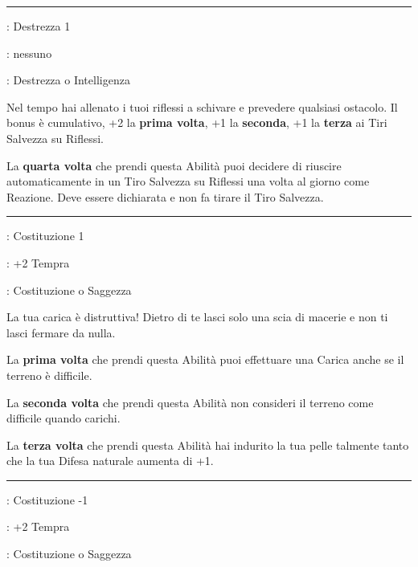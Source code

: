 \begin{multicols}{2}
\smallskip\noindent\rule{\linewidth}{2pt} \hypertarget{Riflessi fulminei}{}\medskip{}
\noindent
\begin{description}[noitemsep, topsep=0pt, parsep=0pt, partopsep=0pt, leftmargin=0cm, labelwidth=2.5cm]
    \item[\textbf{Requisito}]: Destrezza 1
    \item[\textbf{Tiri Salvezza}]: nessuno
    \item[\textbf{Caratteristica}]: Destrezza o Intelligenza
\end{description}

Nel tempo hai allenato i tuoi riflessi a schivare e prevedere qualsiasi ostacolo. Il bonus è cumulativo, +2 la \textbf{prima volta}, +1 la \textbf{seconda}, +1 la \textbf{terza} ai Tiri Salvezza su Riflessi.

La \textbf{quarta volta} che prendi questa Abilità puoi decidere di riuscire automaticamente in un Tiro Salvezza su Riflessi una volta al giorno come Reazione. Deve essere dichiarata e non fa tirare il Tiro Salvezza.

\smallskip\noindent\rule{\linewidth}{2pt} \hypertarget{abRinoceronte}{}\medskip{}\label{Rinoceronte}
\noindent
\begin{description}[noitemsep, topsep=0pt, parsep=0pt, partopsep=0pt, leftmargin=0cm, labelwidth=2.5cm]
    \item[\textbf{Requisito}]: Costituzione 1
    \item[\textbf{Tiri Salvezza}]: +2 Tempra
    \item[\textbf{Caratteristica}]: Costituzione o Saggezza
\end{description}

La tua carica è distruttiva! Dietro di te lasci solo una scia di macerie e non ti lasci fermare da nulla.

La \textbf{prima volta} che prendi questa Abilità puoi effettuare una Carica anche se il terreno è difficile.

La \textbf{seconda volta} che prendi questa Abilità non consideri il terreno come difficile quando carichi.

La \textbf{terza volta} che prendi questa Abilità hai indurito la tua pelle talmente tanto che la tua Difesa naturale aumenta di +1.

\smallskip\noindent\rule{\linewidth}{2pt} \hypertarget{Robusto}{}\medskip{}
\noindent
\begin{description}[noitemsep, topsep=0pt, parsep=0pt, partopsep=0pt, leftmargin=0cm, labelwidth=2.5cm]
    \item[\textbf{Requisito}]: Costituzione -1
    \item[\textbf{Tiri Salvezza}]: +2 Tempra
    \item[\textbf{Caratteristica}]: Costituzione o Saggezza
\end{description}


\end{multicols}
